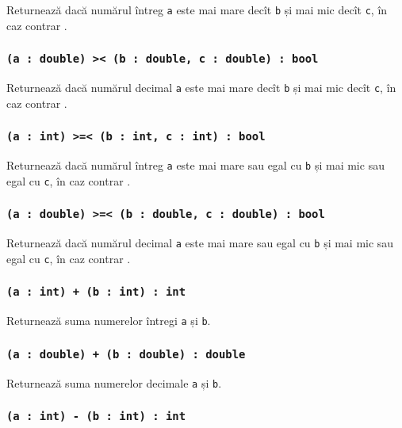 Returnează \true{} dacă numărul întreg \texttt{a} este mai mare decît \texttt{b} și mai mic decît \texttt{c}, în caz contrar \false{}.

\subsubsection{\texttt{(a : double) >< (b : double, c : double) : bool}}

Returnează \true{} dacă numărul decimal \texttt{a} este mai mare decît \texttt{b} și mai mic decît \texttt{c}, în caz contrar \false{}.

\subsubsection{\texttt{(a : int) >=< (b : int, c : int) : bool}}

Returnează \true{} dacă numărul întreg \texttt{a} este mai mare sau egal cu \texttt{b} și mai mic sau egal cu \texttt{c}, în caz contrar \false{}.

\subsubsection{\texttt{(a : double) >=< (b : double, c : double) : bool}}

Returnează \true{} dacă numărul decimal \texttt{a} este mai mare sau egal cu \texttt{b} și mai mic sau egal cu \texttt{c}, în caz contrar \false{}.

\subsubsection{\texttt{(a : int) + (b : int) : int}}

Returnează suma numerelor întregi \texttt{a} și \texttt{b}.

\subsubsection{\texttt{(a : double) + (b : double) : double}}

Returnează suma numerelor decimale \texttt{a} și \texttt{b}.

\subsubsection{\texttt{(a : int) - (b : int) : int}}

